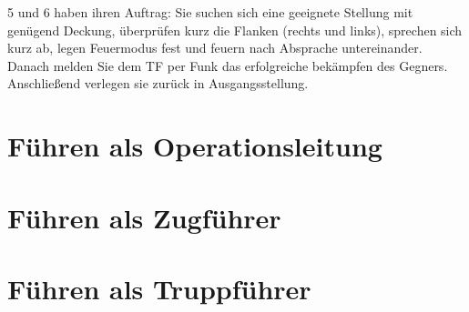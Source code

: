 5 und 6 haben ihren Auftrag: Sie suchen sich eine geeignete Stellung mit genügend Deckung, überprüfen kurz die Flanken (rechts und links), sprechen sich kurz ab, legen Feuermodus fest und feuern nach Absprache untereinander. Danach melden Sie dem TF per Funk das erfolgreiche bekämpfen des Gegners. Anschließend verlegen sie zurück in Ausgangsstellung. 
\section{Führen als Operationsleitung}
\section{Führen als Zugführer}
\section{Führen als Truppführer}